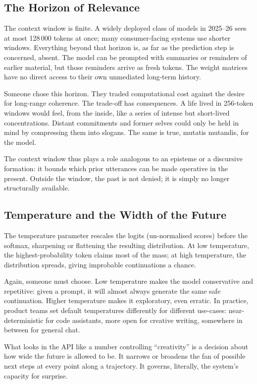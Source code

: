 \documentclass[12pt,a4paper]{report}
\begin{document}
\subsection*{The Horizon of Relevance}

The context window is finite. A widely deployed class of models in 2025--26 sees at most 128\,000 tokens at once; many consumer-facing systems use shorter windows. Everything beyond that horizon is, as far as the prediction step is concerned, absent. The model can be prompted with summaries or reminders of earlier material, but those reminders arrive as fresh tokens. The weight matrices have no direct access to their own unmediated long-term history.

Someone chose this horizon. They traded computational cost against the desire for long-range coherence. The trade-off has consequences. A life lived in 256-token windows would feel, from the inside, like a series of intense but short-lived concentrations. Distant commitments and former selves could only be held in mind by compressing them into slogans. The same is true, mutatis mutandis, for the model.

The context window thus plays a role analogous to an episteme or a discursive formation: it bounds which prior utterances can be made operative in the present. Outside the window, the past is not denied; it is simply no longer structurally available.

\subsection*{Temperature and the Width of the Future}

The temperature parameter rescales the logits (un-normalised scores) before the softmax, sharpening or flattening the resulting distribution. At low temperature, the highest-probability token claims most of the mass; at high temperature, the distribution spreads, giving improbable continuations a chance.

Again, someone must choose. Low temperature makes the model conservative and repetitive: given a prompt, it will almost always generate the same safe continuation. Higher temperature makes it exploratory, even erratic. In practice, product teams set default temperatures differently for different use-cases: near-deterministic for code assistants, more open for creative writing, somewhere in between for general chat.

What looks in the API like a number controlling ``creativity'' is a decision about how wide the future is allowed to be. It narrows or broadens the fan of possible next steps at every point along a trajectory. It governs, literally, the system's capacity for surprise.
\end{document}
